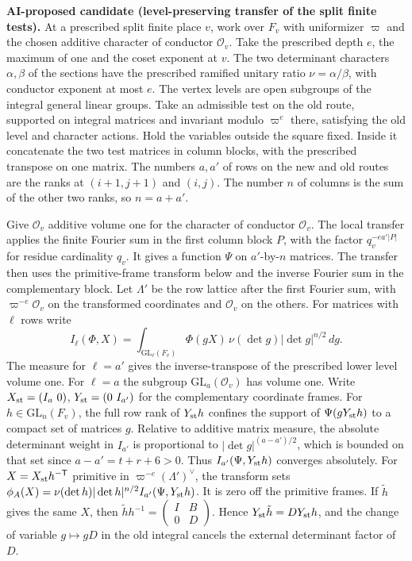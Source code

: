 \noindent\leavevmode{}%
\textbf{AI-proposed candidate (level-preserving transfer of the split finite tests).}
At a prescribed split finite place \(v\), work over \(F_v\) with
uniformizer \(\varpi\) and the chosen additive character of conductor
\(\mathcal O_v\). Take the prescribed depth \(e\), the maximum of
one and the coset exponent at \(v\). The two determinant characters
\(\alpha,\beta\) of the sections have the prescribed ramified unitary
ratio \(\nu=\alpha/\beta\), with conductor exponent at most \(e\).
The vertex levels are open
subgroups of the integral general linear groups. Take an admissible
test on the old route, supported on integral matrices and invariant
modulo \(\varpi^e\) there, satisfying the old level and character
actions. Hold the variables outside the square fixed. Inside it
concatenate the two test matrices in column blocks, with the prescribed
transpose on one matrix. The numbers \(a,a'\) of rows on the new
and old routes are the ranks at \((i+1,j+1)\) and \((i,j)\).
The number \(n\) of columns is the sum of the other two ranks, so
\(n=a+a'\).

Give \(\mathcal O_v\) additive volume one for the character of conductor
\(\mathcal O_v\). The local transfer applies the finite Fourier sum in the
first column block \(P\), with the factor \(q_v^{-ea'|P|}\) for residue
cardinality \(q_v\). It gives a function \(\Psi\) on \(a'\)-by-\(n\)
matrices. The transfer then uses the primitive-frame transform
below and the inverse Fourier sum in the complementary block.
Let \(\Lambda'\) be the row lattice after the first Fourier sum,
with \(\varpi^{-e}\mathcal O_v\) on the transformed coordinates and
\(\mathcal O_v\) on the others. For matrices with \(\ell\) rows write
\[
 I_\ell(\Phi,X)=\int_{\mathrm{GL}_\ell(F_v)}
        \Phi(gX)\,\nu(\det g)|\det g|^{n/2}\,dg .
\]
The measure for \(\ell=a'\) gives the inverse-transpose of the
prescribed lower level volume one. For \(\ell=a\) the subgroup
\(\mathrm{GL}_a(\mathcal O_v)\) has volume one. Write
\(X_{\rm st}=(I_a\ 0)\), \(Y_{\rm st}=(0\ I_{a'})\) for the
complementary coordinate frames. For \(h\in\mathrm{GL}_n(F_v)\),
the full row rank of \(Y_{\rm st}h\) confines the support of
\(\Psi(gY_{\rm st}h)\) to a compact set of matrices \(g\). Relative to
additive matrix measure, the absolute determinant weight in
\(I_{a'}\) is proportional to \(|\det g|^{(a-a')/2}\), which is
bounded on that set since \(a-a'=t+r+6>0\).
Thus \(I_{a'}(\Psi,Y_{\rm st}h)\) converges absolutely.
For \(X=X_{\rm st}h^{-\mathsf T}\) primitive in \(\varpi^{-e}(\Lambda')^\vee\),
the transform sets
\(\phi_A(X)=\nu(\det h)|\det h|^{n/2} I_{a'}(\Psi,Y_{\rm st}h)\).
It is zero off the primitive frames. If \(\tilde h\) gives the same \(X\), then
\(\tilde h h^{-1}=\left(\begin{smallmatrix}I&B\\0&D\end{smallmatrix}\right)\).
Hence \(Y_{\rm st}\tilde h=D Y_{\rm st}h\), and the change of variable
\(g\mapsto gD\) in the old integral cancels the external determinant
factor of \(D\).

